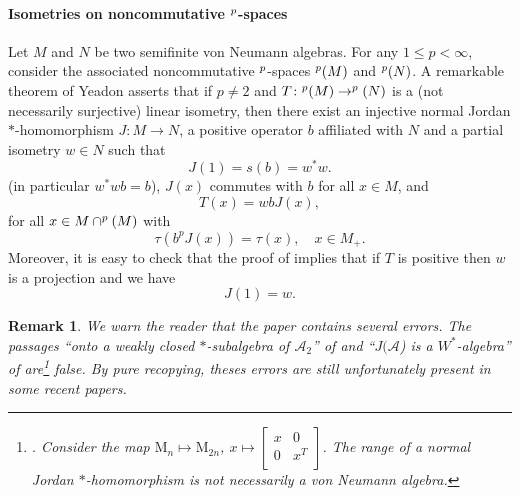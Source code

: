 \documentclass[leqno]{article} %
\let\L\relax
\newcommand{\L}{\mathrm{L}}
\newcommand{\M}{\mathrm{M}}
\renewcommand{\leq}{\ensuremath{\leqslant}}
\newcommand{\co}{\colon}
\newtheorem{remark}[thm]{Remark}
\numberwithin{equation}{section}
\begin{document}
\paragraph{Isometries on noncommutative $\L^p$-spaces} Let $M$ and $N$ be two semifinite von Neumann algebras. For any $1 \leq p < \infty$, consider the associated noncommutative $\L^p$-spaces $\L^p(M)$ and $\L^p(N)$. A remarkable theorem of Yeadon \cite{Yea1} asserts that if $p \not= 2$ and $T \co \L^p(M) \to \L^p(N)$ is a (not necessarily surjective) linear isometry, then there exist an injective normal Jordan $*$-homomorphism $J \co M \to N$, a positive operator $b$ affiliated with $N$ and a partial isometry $w \in N$ such that 
\begin{equation}
\label{Yeadon-complement2}
J(1)
=s(b)
=w^*w.
\end{equation}
(in particular $w^*wb=b$), $J(x)$ commutes with $b$ for all $x \in M$,
and
\begin{equation}
\label{Yeadon}
T(x) 
= wbJ(x),
\end{equation}
for all $x \in M \cap \L^p(M)$ with
\begin{equation}
\label{preservation-trace}
\tau(b^pJ(x))=\tau(x), \quad x \in M_+.
\end{equation}
Moreover, it is easy to check that the proof of \cite[Theorem 2]{Yea1} implies that if $T$ is positive then $w$ is a projection and we have
\begin{equation}
\label{Yeadon-complement}
J(1)
=w.
\end{equation} 

\begin{remark} \normalfont
We warn the reader that the paper \cite{Yea1} contains several errors. The passages ``onto a weakly closed $*$-subalgebra of $\mathcal{A}_2$'' of \cite[Theorem 2]{Yea1} and ``$J(\mathcal{A}$) is a $W^*$-algebra'' of \cite[page 45]{Yea1} are\footnote{\thefootnote. Consider the map $\M_n \mapsto \M_{2n}$, $x \mapsto \begin{bmatrix}
   x  & 0  \\
   0  & x^T  \\
\end{bmatrix}$. The range of a normal Jordan $*$-homomorphism is \textit{not} necessarily  a von Neumann algebra.} false. By pure recopying, theses errors are still unfortunately present in some recent papers.
\end{remark}


\end{document}
